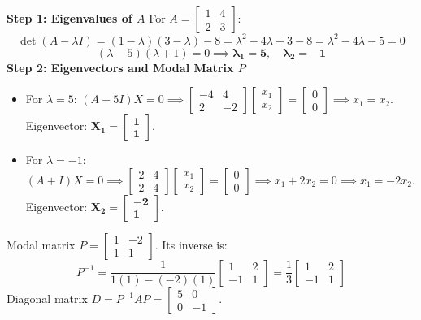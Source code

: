 \begin{solutionbox}
\textbf{Step 1: Eigenvalues of $A$}
For $A = \begin{bmatrix} 1 & 4 \\ 2 & 3 \end{bmatrix}$:
\[
\det(A - \lambda I) = (1 - \lambda)(3 - \lambda) - 8 = \lambda^2 - 4\lambda + 3 - 8 = \lambda^2 - 4\lambda - 5 = 0
\]
\[
(\lambda - 5)(\lambda + 1) = 0 \implies \mathbf{\lambda_1 = 5, \quad \lambda_2 = -1}
\]
\textbf{Step 2: Eigenvectors and Modal Matrix $P$}
\begin{itemize}[leftmargin=6mm]
    \item For $\lambda = 5$: $(A - 5I)X = 0 \implies \begin{bmatrix} -4 & 4 \\ 2 & -2 \end{bmatrix}\begin{bmatrix} x_1 \\ x_2 \end{bmatrix} = \begin{bmatrix} 0 \\ 0 \end{bmatrix} \implies x_1 = x_2$.
    Eigenvector: $\mathbf{X_1 = \begin{bmatrix} 1 \\ 1 \end{bmatrix}}$.
    \item For $\lambda = -1$: $(A + I)X = 0 \implies \begin{bmatrix} 2 & 4 \\ 2 & 4 \end{bmatrix}\begin{bmatrix} x_1 \\ x_2 \end{bmatrix} = \begin{bmatrix} 0 \\ 0 \end{bmatrix} \implies x_1 + 2x_2 = 0 \implies x_1 = -2x_2$.
    Eigenvector: $\mathbf{X_2 = \begin{bmatrix} -2 \\ 1 \end{bmatrix}}$.
\end{itemize}
Modal matrix $P = \begin{bmatrix} 1 & -2 \\ 1 & 1 \end{bmatrix}$. Its inverse is:
\[
P^{-1} = \frac{1}{1(1) - (-2)(1)}\begin{bmatrix} 1 & 2 \\ -1 & 1 \end{bmatrix} = \frac{1}{3}\begin{bmatrix} 1 & 2 \\ -1 & 1 \end{bmatrix}
\]
Diagonal matrix $D = P^{-1} A P = \begin{bmatrix} 5 & 0 \\ 0 & -1 \end{bmatrix}$.


\end{solutionbox}
